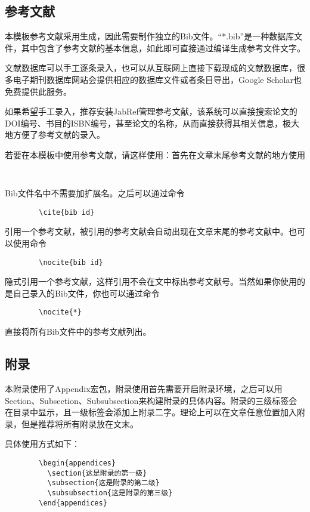 \documentclass[UTF8]{ctexart}
\begin{document}
	\subsection{参考文献}
	本模板参考文献采用\BibTeX 生成，因此需要制作独立的Bib文件。“*.bib”是一种数据库文件，其中包含了参考文献的基本信息，如此即可直接通过编译生成参考文件文字。
	
	文献数据库可以手工逐条录入，也可以从互联网上直接下载现成的文献数据库，很多电子期刊数据库网站会提供相应的\BibTeX 数据库文件或者\BibTeX 条目导出，Google\textsuperscript{\textregistered}  Scholar也免费提供此服务。\cite[\S 3.3]{9787121202087}
	
	如果希望手工录入，推荐安装JabRef管理参考文献，该系统可以直接搜索论文的DOI编号、书目的ISBN编号，甚至论文的名称，从而直接获得其相关信息，极大地方便了参考文献的录入。
	
	若要在本模板中使用参考文献，请这样使用：首先在文章末尾参考文献的地方使用
	\begin{verbatim}
		
	\end{verbatim}
	Bib文件名中不需要加扩展名。之后可以通过命令
	\begin{verbatim}
		\cite{bib id}
	\end{verbatim}
	引用一个参考文献，被引用的参考文献会自动出现在文章末尾的参考文献中。也可以使用命令
	\begin{verbatim}
		\nocite{bib id}
	\end{verbatim}
	隐式引用一个参考文献，这样引用不会在文中标出参考文献号。当然如果你使用的是自己录入的Bib文件，你也可以通过命令
	\begin{verbatim}
		\nocite{*}
	\end{verbatim}
	直接将所有Bib文件中的参考文献列出。
	
	\subsection{附录}
	本附录使用了Appendix宏包，附录使用首先需要开启附录环境，之后可以用Section、Subsection、Subsubsection来构建附录的具体内容。附录的三级标签会在目录中显示，且一级标签会添加上附录二字。理论上可以在文章任意位置加入附录，但是推荐将所有附录放在文末。
	
	具体使用方式如下：
	\begin{verbatim}
		\begin{appendices}
		  \section{这是附录的第一级}
		  \subsection{这是附录的第二级}
		  \subsubsection{这是附录的第三级}
		\end{appendices}
	\end{verbatim}
	
\end{document}
